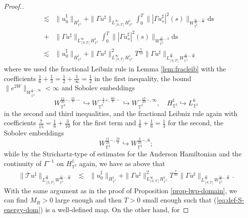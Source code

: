 \begin{proof}[Proof.]
\begin{eqnarray*}
    & \lesssim & \| u_0^{\sharp} \|_{H_{\mathbb{T}^3}^1} + \| \Gamma
    u^{\sharp} \|_{L_{[0, T]}^{\infty} H_{\mathbb{T}^3}^1} \int^T_0 \|
    | \Gamma u_s^{\sharp} |^2 (s) \|_{W_{\mathbb{T}^3}^{\frac{11}{20} -,
    \frac{15}{7}}} \mathrm{ds}\\
    & + & \| \Gamma
    u^{\sharp} \|_{L_{[0, T]}^{\infty} H_{\mathbb{T}^3}^1} \int^T_0 \| | \Gamma u_s^{\sharp} |^2 (s)
    \|_{W_{\mathbb{T}^3}^{\frac{3}{20} -, 3}} \mathrm{ds}\\
    & \lesssim & \| u_0^{\sharp} \|_{H_{\mathbb{T}^3}^1} + \| \Gamma
    u^{\sharp} \|^2_{L_{[0, T]}^{\infty} H_{\mathbb{T}^3}^1} T^{\frac{7}{10}}
    \| \Gamma u^{\sharp} \|_{L_{[0, T]}^{\frac{10}{3}}
    W_{\mathbb{T}^3}^{\frac{11}{20} -, \frac{10}{3}}}
  \end{eqnarray*}
  where we used the fractional Leibniz rule in Lemma \ref{lem:fracleib} with
  the coefficients $\frac{1}{6} + \frac{1}{3} = \frac{1}{2} + \frac{1}{\infty}
  = \frac{1}{2}$ in the first inequality, the bound $\| e^{2 W}
  \|_{W_{\mathbb{T}^3}^{\frac{1}{2} -, \infty}} < \infty$ and Sobolev embeddings
  \[ W_{\mathbb{T}^3}^{\frac{11}{20} -, \frac{15}{7} -} \hookrightarrow
     W_{\mathbb{T}^3}^{- \frac{1}{2} +, \frac{60}{7} -} \hookrightarrow
     W_{\mathbb{T}^3}^{- \frac{17}{20} -, \infty}, \quad H_{\mathbb{T}^3}^1
     \hookrightarrow L_{\mathbb{T}^3}^6 \]
  in the second and third inequalities, and the fractional Leibniz rule again
  with coefficients $\frac{7}{15} = \frac{1}{6} + \frac{3}{10}$ for the first
  term and $\frac{1}{6} + \frac{1}{6} = \frac{1}{3}$ for the second, the
  Sobolev embeddings
  \[ W_{\mathbb{T}^3}^{\frac{11}{20} -, \frac{10}{3}} \hookrightarrow
     W_{\mathbb{T}^3}^{\frac{3}{20} -, 6} ; \]
  while by the Strichartz-type of estimates for the Anderson Hamiltonian and
  the continuity of $\Gamma^{- 1}$ on $H_{\mathbb{T}^3}^1$ again, we have as
  above that
  \begin{eqnarray*}
    \| \mathcal{T} u^{\sharp} \|_{L_{[0, T]}^{\frac{10}{3}}
    {W_{\mathbb{T}^3}^{\frac{11}{20} -, \frac{10}{3}}} } & \lesssim & \|
    u_0^{\sharp} \|_{H_{\mathbb{T}^3}^1} + \| \Gamma u^{\sharp} \|^2_{L_{[0,
    T]}^{\infty} H_{\mathbb{T}^3}^1} T^{\frac{7}{10}} \| \Gamma u^{\sharp}
    \|_{L_{[0, T]}^{\frac{10}{3}} W_{\mathbb{T}^3}^{\frac{11}{20} -,
    \frac{10}{3}}} .
  \end{eqnarray*}
  With the same argument as in the proof of Proposition \ref{prop-lwp-domain},
  we can find $M_R > 0$ large enough and then $T > 0$ small enough such that
  (\ref{eq:def-S-energy-dom}) is a well-defined map. On the other hand, for

\end{proof}

